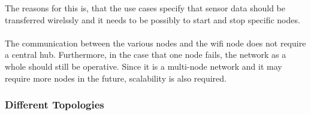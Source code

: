 The reasons for this is, that the use cases specify that sensor data should be transferred wirelssly and it needs to be possibly to start and stop specific nodes.
\\\\
The communication between the various nodes and the wifi node does not require a central hub.
Furthermore, in the case that one node fails, the network as a whole should still be operative.
Since it is a multi-node network and it may require more nodes in the future, scalability is also required.

\subsubsection{Different Topologies}~\\
